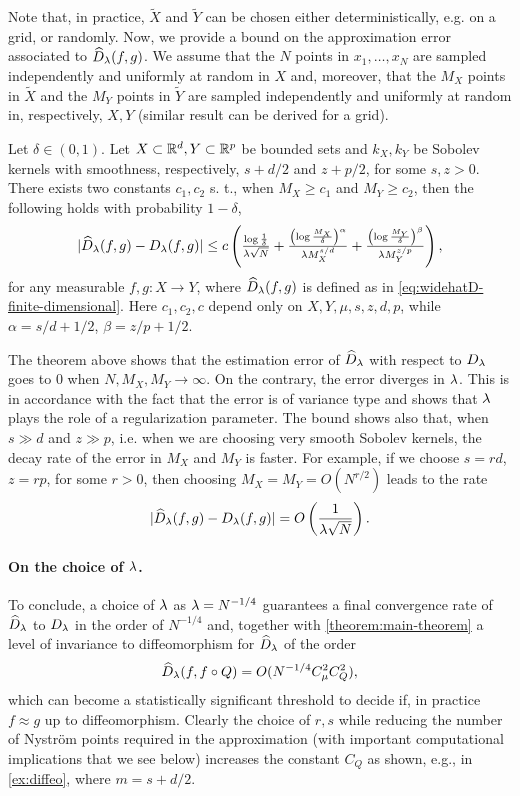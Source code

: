 Note that, in practice, $\widetilde X$ and $\widetilde Y$ can be chosen either deterministically, e.g. on a grid, or randomly. Now, we provide a bound on the approximation error associated to $\widehat{D}_\lambda(f,g)$. We assume that the $N$ points in $x_1,\dots, x_N$ are sampled independently and uniformly at random in $X$ and, moreover, that the $M_X$ points in $\widetilde{X}$ and the $M_Y$ points in $\widetilde{Y}$ are sampled independently and uniformly at random in, respectively, $X, Y$ (similar result can be derived for a grid).
\begin{theorem}\label{thm:appr-error-widehatD}
Let $\delta \in (0,1)$. Let $X \subset \mathbb R^d, Y \subset \mathbb R^p$ be bounded sets and $k_X, k_Y$ be Sobolev kernels with smoothness, respectively, $s + d/2$ and $z+p/2$, for some $s,z > 0$. There exists two constants $c_1, c_2$ s. t., when $M_X \geq c_1$ and $M_Y \geq c_2$, then the following holds with probability $1-\delta$,
$$|\widehat{D}_\lambda(f,g) - D_\lambda(f,g)| \leq c\left(\tfrac{\log\frac{1}{\delta}}{\lambda\sqrt{N}} + \tfrac{\left(\log \frac{M_X}{\delta}\right)^{\alpha}}{\lambda M_X^{s/d}} + \tfrac{\left(\log\frac{M_Y}{\delta}\right)^{\beta}}{\lambda M_Y^{z/p}}\right),$$
for any measurable $f,g : X \to Y$, where $\widehat{D}_\lambda(f,g)$ is defined as in \cref{eq:widehatD-finite-dimensional}. Here $c_1, c_2, c$ depend only on $X, Y, \mu, s, z, d, p$, while $\alpha = s/d+1/2$, $\beta = z/p+1/2$.
\end{theorem}

The theorem above shows that the estimation error of $\widehat{D}_\lambda$ with respect to $D_\lambda$ goes to $0$ when $N, M_X, M_Y \to \infty$. On the contrary, the error diverges in $\lambda$. This is in accordance with the fact that the error is of variance type and shows that $\lambda$ plays the role of a regularization parameter. The bound shows also that, when $s \gg d$ and $z \gg p$, i.e. when we are choosing very smooth Sobolev kernels, the decay rate of the error in $M_X$ and $M_Y$ is faster. For example, if we choose $s = r d$, $z = r p$, for some $r > 0$, then choosing $M_X = M_Y =  O(N^{r/2})$ leads to the rate
$$ |\widehat{D}_\lambda(f,g) - D_\lambda(f,g)| = O\left(\frac{1}{\lambda \sqrt{N}}\right).$$

\paragraph{On the choice of $\lambda$.}
To conclude, a choice of $\lambda$ as $\lambda = N^{-1/4}$ guarantees a final convergence rate of $\widehat{D}_\lambda$ to $D_\lambda$ in the order of $N^{-1/4}$ and, together with \cref{theorem:main-theorem} a level of invariance to diffeomorphism for $\widehat{D}_\lambda$ of the order
$$\widehat{D}_\lambda(f, f \circ Q) = O(N^{-1/4} C_\mu^2 C_Q^2),$$
which can become a statistically significant threshold to decide if, in practice $f \approx g$ up to diffeomorphism.
Clearly the choice of $r,s$ while reducing the number of Nystr\"om points required in the approximation (with important computational implications that we see below) increases the constant $C_Q$ as shown, e.g., in \cref{ex:diffeo}, where $m = s + d/2$.


